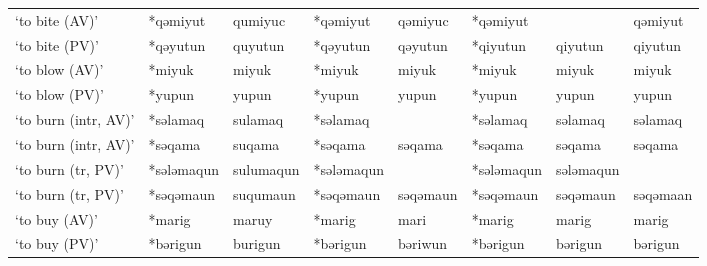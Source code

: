 \begin{landscape}
\begin{longtable}[c]{@{}p{3cm}<{\raggedright}p{2.75cm}<{\raggedright}p{2.75cm}<{\raggedright}p{2.75cm}<{\raggedright}p{2.75cm}<{\raggedright}p{2.75cm}<{\raggedright}p{2.75cm}<{\raggedright}p{2.75cm}<{\raggedright}@{}}
`to bite (AV)'                                       & *qəmiyut     & qumiyuc                       & *qəmiyut       & qəmiyuc                    & *qəmiyut         &                          & qəmiyut                           \\
`to bite (PV)'                                       & *qəyutun     & quyutun                       & *qəyutun       & qəyutun                    & *qiyutun         & qiyutun                  & qiyutun                           \\
`to blow (AV)'                                       & *miyuk       & miyuk                         & *miyuk         & miyuk                      & *miyuk           & miyuk                    & miyuk                             \\
`to blow (PV)'                                       & *yupun       & yupun                         & *yupun         & yupun                      & *yupun           & yupun                    & yupun                             \\
`to burn (intr, AV)'                                 & *səlamaq     & sulamaq                       & *səlamaq       &                            & *səlamaq         & səlamaq                  & səlamaq                           \\
`to burn (intr, AV)'                                 & *səqama      & suqama                        & *səqama        & səqama                     & *səqama          & səqama                   & səqama                            \\
`to burn (tr, PV)'                                   & *sələmaqun   & sulumaqun                     & *sələmaqun     &                            & *sələmaqun       & sələmaqun                &                                   \\
`to burn (tr, PV)'                                   & *səqəmaun    & suqumaun                      & *səqəmaun      & səqəmaun                   & *səqəmaun        & səqəmaun                 & səqəmaan                          \\
`to buy (AV)'                                        & *marig       & maruy                         & *marig         & mari                       & *marig           & marig                    & marig                             \\
`to buy (PV)'                                        & *bərigun     & burigun                       & *bərigun       & bəriwun                    & *bərigun         & bərigun                  & bərigun                           \\

\end{longtable}
\end{landscape}
